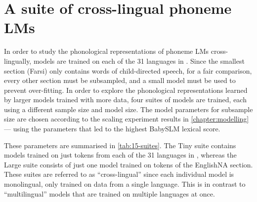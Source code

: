 


\section{A suite of cross-lingual phoneme LMs}\label{sec:15-suite}

In order to study the phonological representations of phoneme LMs cross-lingually, \gpt models are trained on each of the 31 languages in \ipachildes. Since the smallest section (Farsi) only contains  words of child-directed speech, for a fair comparison, every other section must be subsampled, and a small model must be used to prevent over-fitting. In order to explore the phonological representations learned by larger models trained with more data, four suites of models are trained, each using a different sample size and model size. The model parameters for subsample size are chosen according to the scaling experiment results in \cref{chapter:modelling} --- using the parameters that led to the highest BabySLM lexical score.

These parameters are summarised in \cref{tab:15-suites}. The Tiny suite contains models trained on just  tokens from each of the 31 languages in \ipachildes, whereas the Large suite consists of just one model trained on  tokens of the EnglishNA section. These suites are referred to as ``cross-lingual'' since each individual model is monolingual, only trained on data from a single language. This is in contrast to ``multilingual'' models that are trained on multiple languages at once.

